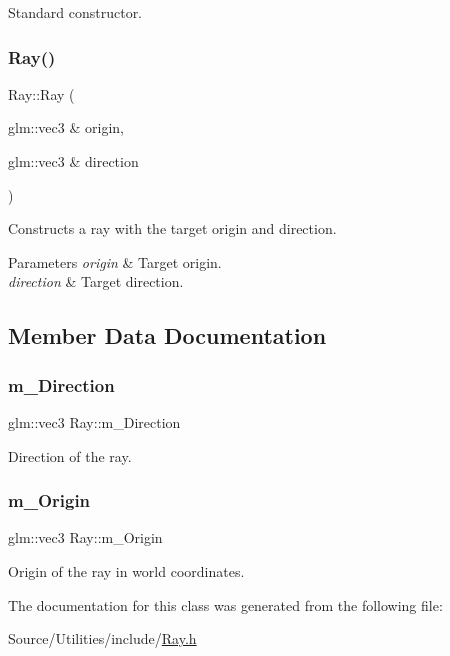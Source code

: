 Standard constructor. \hypertarget{class_ray_ae5670c390428ae21b8066329d87e1ad9}{}\label{class_ray_ae5670c390428ae21b8066329d87e1ad9} 
\subsubsection{\texorpdfstring{Ray()}{Ray()}\hspace{0.1cm}{\footnotesize\ttfamily [2/2]}}
{\footnotesize\ttfamily Ray\+::\+Ray (\begin{DoxyParamCaption}\item[{glm\+::vec3 \&}]{origin,  }\item[{glm\+::vec3 \&}]{direction }\end{DoxyParamCaption})}

Constructs a ray with the target origin and direction. 
\begin{DoxyParams}{Parameters}
{\em origin} & Target origin. \\
\hline
{\em direction} & Target direction. \\
\hline
\end{DoxyParams}


\subsection{Member Data Documentation}
\hypertarget{class_ray_a1fe0679dfa9ead77bf81d4c7a8b87175}{}\label{class_ray_a1fe0679dfa9ead77bf81d4c7a8b87175} 
\subsubsection{\texorpdfstring{m\+\_\+\+Direction}{m\_Direction}}
{\footnotesize\ttfamily glm\+::vec3 Ray\+::m\+\_\+\+Direction}

Direction of the ray. \hypertarget{class_ray_ab94919c6ebaa2fd3628d8bc85669e79a}{}\label{class_ray_ab94919c6ebaa2fd3628d8bc85669e79a} 
\subsubsection{\texorpdfstring{m\+\_\+\+Origin}{m\_Origin}}
{\footnotesize\ttfamily glm\+::vec3 Ray\+::m\+\_\+\+Origin}

Origin of the ray in world coordinates. 

The documentation for this class was generated from the following file\+:\begin{DoxyCompactItemize}
\item 
Source/\+Utilities/include/\hyperlink{_ray_8h}{Ray.\+h}\end{DoxyCompactItemize}

